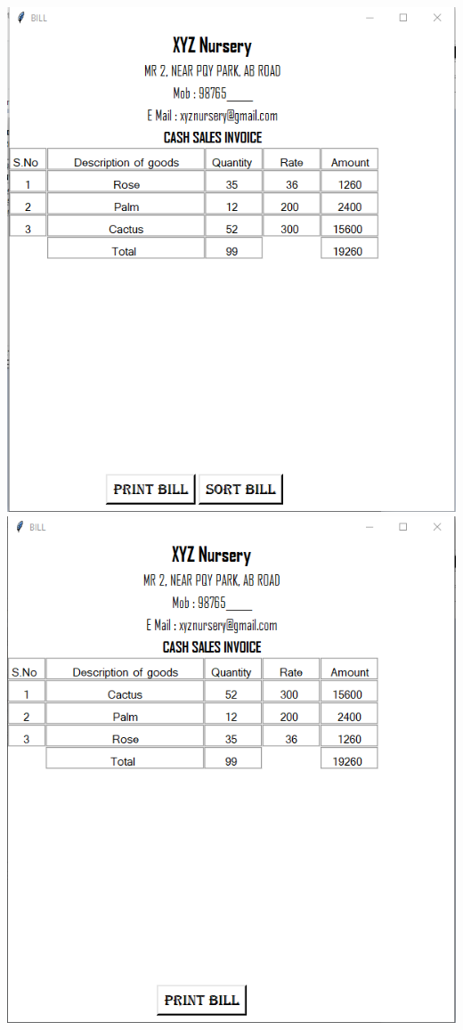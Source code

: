 \documentclass[11pt,a4paper]{article}
\begin{document}
\includegraphics{output6.png}\\
\includegraphics{output7.png}\\
\end{document}
